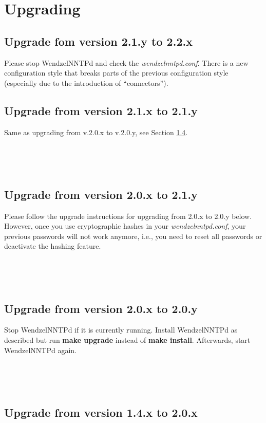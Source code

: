 \chapter{Upgrading}\label{Ch:Upgrade}

\section{Upgrade fom version 2.1.y to 2.2.x}

Please stop WendzelNNTPd and check the \textit{wendzelnntpd.conf}. There is a new configuration style that breaks parts of the previous configuration style (especially due to the introduction of ``connectors'').

\section{Upgrade from version 2.1.x to 2.1.y}

Same as upgrading from v.2.0.x to v.2.0.y, see Section \ref{20xto20y}.

~

~

\section{Upgrade from version 2.0.x to 2.1.y}

Please follow the upgrade instructions for upgrading from 2.0.x to 2.0.y below. However, once you use cryptographic hashes in your \textit{wendzelnntpd.conf}, your previous passwords will not work anymore, i.e., you need to reset all passwords or deactivate the hashing feature.

~

~

\section{Upgrade from version 2.0.x to 2.0.y}\label{20xto20y}

Stop WendzelNNTPd if it is currently running. Install WendzelNNTPd as described but run \textbf{make upgrade} instead of \textbf{make install}. Afterwards, start WendzelNNTPd again.

~

~

\section{Upgrade from version 1.4.x to 2.0.x}

